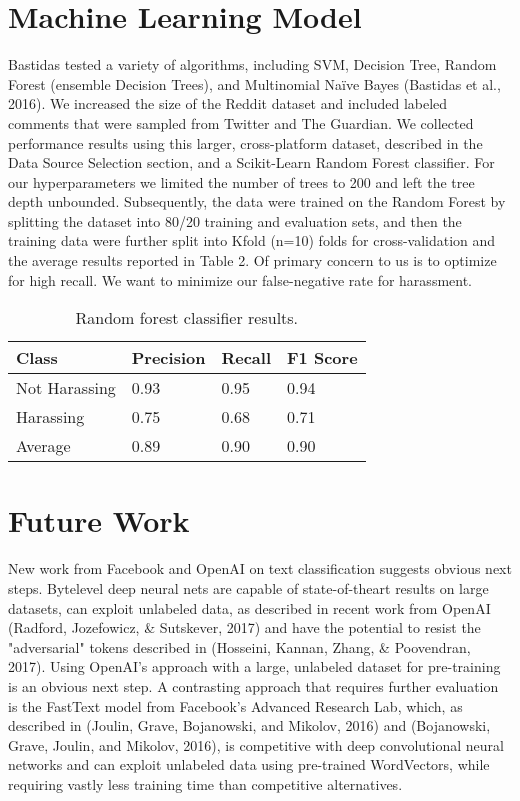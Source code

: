 \documentclass[11pt,a4paper]{article}
\begin{document}
\section{Machine Learning Model}
Bastidas tested a variety of algorithms, including
SVM, Decision Tree, Random Forest (ensemble
Decision Trees), and Multinomial Naïve Bayes
(Bastidas et al., 2016). We increased the size of the
Reddit dataset and included labeled comments that
were sampled from Twitter and The Guardian. We
collected performance results using this larger,
cross-platform dataset, described in the Data
Source Selection section, and a Scikit-Learn Random
Forest classifier. For our hyperparameters we
limited the number of trees to 200 and left the tree
depth unbounded. Subsequently, the data were
trained on the Random Forest by splitting the dataset
into 80/20 training and evaluation sets, and
then the training data were further split into Kfold
(n=10) folds for cross-validation and the average
results reported in Table 2. Of primary concern to
us is to optimize for high recall. We want to minimize
our false-negative rate for harassment.

\begin{table}[h]
\begin{center}
\begin{tabular}{|l|l|l|l|}
\hline \bf Class & \bf Precision & \bf Recall & \bf F1 Score \\ \hline
Not Harassing & 0.93 & 0.95 & 0.94 \\
Harassing & 0.75 & 0.68 & 0.71 \\
Average & 0.89 & 0.90 & 0.90 \\
\hline
\end{tabular}
\end{center}
\caption{\label{font-table} Random forest classifier results. }
\end{table}

\section{Future Work}
New work from Facebook and OpenAI on text
classification suggests obvious next steps. Bytelevel
deep neural nets are capable of state-of-theart
results on large datasets, can exploit unlabeled
data, as described in recent work from OpenAI
(Radford, Jozefowicz, \& Sutskever, 2017) and
have the potential to resist the "adversarial" tokens
described in (Hosseini, Kannan, Zhang, \& Poovendran,
2017). Using OpenAI's approach with a large,
unlabeled dataset for pre-training is an obvious
next step. A contrasting approach that requires further
evaluation is the FastText model from Facebook's
Advanced Research Lab, which, as described
in (Joulin, Grave, Bojanowski, and
Mikolov, 2016) and (Bojanowski, Grave, Joulin,
and Mikolov, 2016), is competitive with deep convolutional
neural networks and can exploit unlabeled
data using pre-trained WordVectors, while requiring
vastly less training time than competitive
alternatives.
\end{document}
